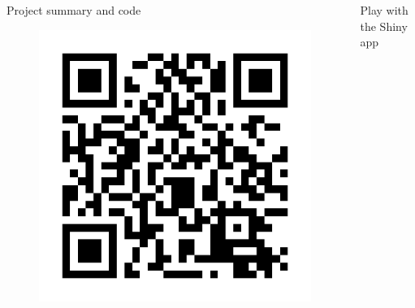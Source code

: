 \documentclass{beamer}\usepackage[]{graphicx}\usepackage[]{xcolor}
\makeatletter
\def\maxwidth{ %
  \ifdim\Gin@nat@width>\linewidth
    \linewidth
  \else
    \Gin@nat@width
  \fi
}
\newenvironment{knitrout}{}{} %
\makeatother
\begin{document}
\begin{frame}[fragile]
\begin{columns}
  \end{columns}

  \bigskip
  {\hrulefill}
  \bigskip


\begin{columns}

  \begin{column}{.28\textwidth}
    \begin{block}{\centering Project summary and code}
      \begin{figure}
        \centering
\begin{knitrout}
\color{fgcolor}

{\centering \includegraphics[width=\maxwidth]{figure/QR-code-github-1} 

}


\end{knitrout}
      \end{figure}

    \end{block}
  \end{column}

  \begin{column}{.28\textwidth}
    \begin{block}{\centering Play with the Shiny app}
      \begin{figure}
        \centering
\begin{knitrout}
\color{fgcolor}


\end{knitrout}
\end{figure}
\end{block}
\end{column}
\end{columns}
\end{frame}
\end{document}
